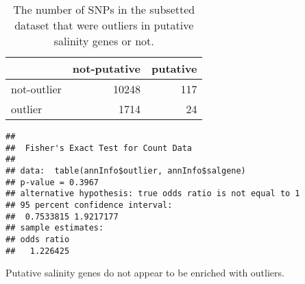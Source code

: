 \documentclass[11pt,]{article}
\newenvironment{Shaded}{\begin{snugshade}}{\end{snugshade}}
\newcommand{\KeywordTok}[1]{\textcolor[rgb]{0.13,0.29,0.53}{\textbf{#1}}}
\newcommand{\DataTypeTok}[1]{\textcolor[rgb]{0.13,0.29,0.53}{#1}}
\newcommand{\StringTok}[1]{\textcolor[rgb]{0.31,0.60,0.02}{#1}}
\newcommand{\OtherTok}[1]{\textcolor[rgb]{0.56,0.35,0.01}{#1}}
\newcommand{\OperatorTok}[1]{\textcolor[rgb]{0.81,0.36,0.00}{\textbf{#1}}}
\newcommand{\NormalTok}[1]{#1}
\begin{document}
\begin{Shaded}
\end{Shaded}

\begin{table}

\caption{\label{tab:putativeGeneAnns}The number of SNPs in the subsetted dataset that were outliers in putative salinity genes or not.}
\centering
\begin{tabular}[t]{lrr}
\toprule
  & not-putative & putative\\
\midrule
not-outlier & 10248 & 117\\
outlier & 1714 & 24\\
\bottomrule
\end{tabular}
\end{table}

\begin{Shaded}
\end{Shaded}

\begin{verbatim}
## 
##  Fisher's Exact Test for Count Data
## 
## data:  table(annInfo$outlier, annInfo$salgene)
## p-value = 0.3967
## alternative hypothesis: true odds ratio is not equal to 1
## 95 percent confidence interval:
##  0.7533815 1.9217177
## sample estimates:
## odds ratio 
##   1.226425
\end{verbatim}

Putative salinity genes do not appear to be enriched with outliers.
\end{document}
